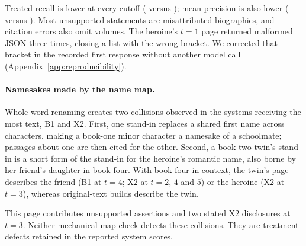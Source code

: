 Treated recall is lower at every cutoff ( versus
); mean precision is also lower
( versus ).
Most unsupported statements are misattributed biographies, and citation errors
also omit volumes. The heroine's $t=1$ page returned malformed JSON three times,
closing a list with the wrong bracket. We corrected that bracket in the
recorded first response without another model call
(Appendix~\ref{app:reproducibility}).

\paragraph{Namesakes made by the name map.}
Whole-word renaming creates two collisions observed in the systems receiving the most
text, B1 and X2. First, one stand-in replaces a shared first name across characters,
making a book-one minor character a namesake of a schoolmate; passages about one
are then cited for the other. Second, a book-two twin's stand-in is a short form
of the stand-in for the heroine's romantic name, also borne by her friend's
daughter in book four. With book four in context, the twin's page describes
the friend (B1 at $t=4$; X2 at $t=2$, $4$ and $5$) or the heroine
(X2 at $t=3$), whereas original-text builds describe the twin.

This page contributes unsupported assertions and two stated X2 disclosures
at $t=3$. Neither mechanical map check detects these collisions. They are
treatment defects retained in the reported system scores.

